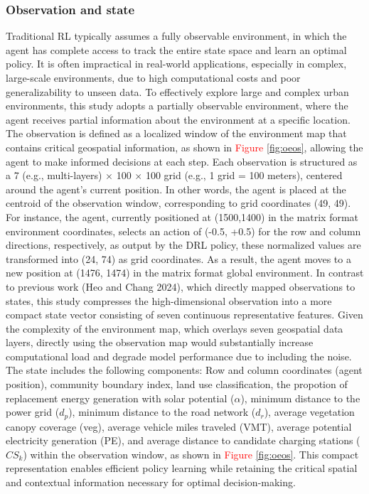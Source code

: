 \documentclass[preprint,12pt]{elsarticle}
\begin{document}
\subsubsection{Observation and state}
Traditional RL typically assumes a fully observable environment, in which the agent has complete access to track the entire state space and learn an optimal policy. It is often impractical in real-world applications, especially in complex, large-scale environments, due to high computational costs and poor generalizability to unseen data. To effectively explore large and complex urban environments, this study adopts a partially observable environment, where the agent receives partial information about the environment at a specific location. The observation is defined as a localized window of the environment map that contains critical geospatial information, as shown in \textcolor{red}{Figure} \ref{fig:oeos}, allowing the agent to make informed decisions at each step. Each observation is structured as a 7 (e.g., multi-layers) $\times $ 100 $\times $ 100 grid (e.g., 1 grid = 100 meters), centered around the agent's current position. In other words, the agent is placed at the centroid of the observation window, corresponding to grid coordinates (49, 49). For instance, the agent, currently positioned at (1500,1400) in the matrix format environment coordinates, selects an action of (-0.5, +0.5) for the row and column directions, respectively, as output by the DRL policy, these normalized values are transformed into (24, 74) as grid coordinates. As a result, the agent moves to a new position at (1476, 1474) in the matrix format global environment. In contrast to previous work (Heo and Chang 2024), which directly mapped observations to states, this study compresses the high-dimensional observation into a more compact state vector consisting of seven continuous representative features. Given the complexity of the environment map, which overlays seven geospatial data layers, directly using the observation map would substantially increase computational load and degrade model performance due to including the noise. The state includes the following components: Row and column coordinates (agent position), community boundary index, land use classification, the propotion of replacement energy generation with solar potential ($\alpha$), minimum distance to the power grid ($d_p$), minimum distance to the road network ($d_r$), average vegetation canopy coverage  (veg), average vehicle miles traveled (VMT), average potential electricity generation (PE), and average distance to candidate charging stations ($CS_k$) within the observation window, as shown in \textcolor{red}{Figure} \ref{fig:oeos}. This compact representation enables efficient policy learning while retaining the critical spatial and contextual information necessary for optimal decision-making. 
\end{document}
